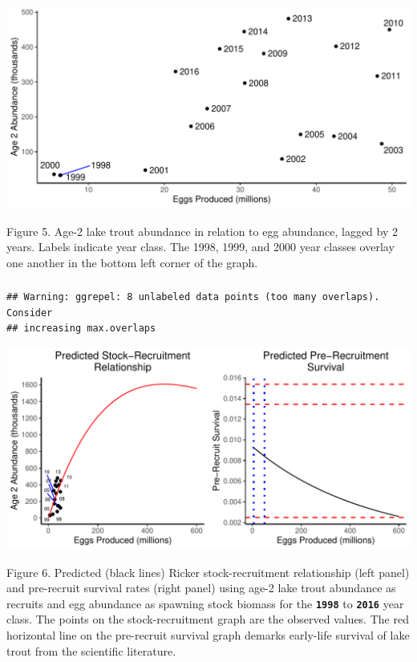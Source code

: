 \documentclass[
]{article}
\begin{document}
\hypertarget{fig5}{%
\subsubsection{}\label{fig5}}

\includegraphics{Yellowstone-import-code_files/figure-latex/unnamed-chunk-5-1.pdf}

Figure 5. Age-2 lake trout abundance in relation to egg abundance,
lagged by 2 years. Labels indicate year class. The 1998, 1999, and 2000
year classes overlay one another in the bottom left corner of the
graph.\\
\pagebreak

\hypertarget{fig6}{%
\subsubsection{}\label{fig6}}

\begin{verbatim}
## Warning: ggrepel: 8 unlabeled data points (too many overlaps). Consider
## increasing max.overlaps
\end{verbatim}

\includegraphics{Yellowstone-import-code_files/figure-latex/unnamed-chunk-6-1.pdf}

Figure 6. Predicted (black lines) Ricker stock-recruitment relationship
(left panel) and pre-recruit survival rates (right panel) using age-2
lake trout abundance as recruits and egg abundance as spawning stock
biomass for the \textbf{\texttt{1998}} to \textbf{\texttt{2016}} year
class. The points on the stock-recruitment graph are the observed
values. The red horizontal line on the pre-recruit survival graph
demarks early-life survival of lake trout from the scientific
literature.
\end{document}
